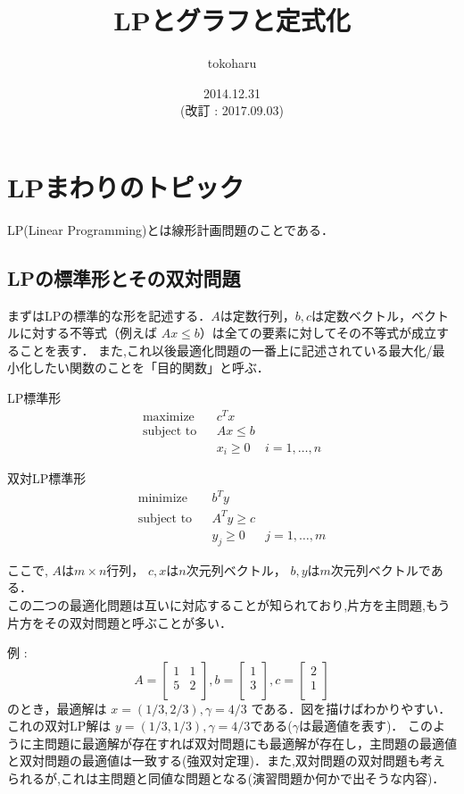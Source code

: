 \documentclass[13pt]{jarticle}
\title{LPとグラフと定式化}
\author{tokoharu}
\date {2014.12.31 \\ (改訂 : 2017.09.03)}
\theoremstyle{nonitalic} %
\begin{document}
\maketitle

\section{LPまわりのトピック}
LP(Linear Programming)とは線形計画問題のことである．
\subsection {LPの標準形とその双対問題}
まずはLPの標準的な形を記述する．$A$は定数行列，$b, c$は定数ベクトル，ベクトルに対する不等式（例えば $Ax \leq b$）は全ての要素に対してその不等式が成立することを表す． また,これ以後最適化問題の一番上に記述されている最大化/最小化したい関数のことを「目的関数」と呼ぶ．

LP標準形
\begin{align}
 &&&&&\textrm{maximize}   && c^Tx \\
 &&&&&\textrm{subject to} && Ax \leq b  &&&&&\\
 &&&&&                    && x_i \geq 0 & i = 1,\dots,n &&&&&
\end{align}

双対LP標準形
\begin{align}
 &&&&&\textrm{minimize}   && b^Ty \\
 &&&&&\textrm{subject to} && A^T y \geq c  &&&&&\\
 &&&&&                    && y_j \geq 0 & j = 1,\dots,m &&&&&
\end{align}

 
ここで, $A$は$m\times n$行列， 
$c,x$は$n$次元列ベクトル， 
$b,y$は$m$次元列ベクトルである． \\

この二つの最適化問題は互いに対応することが知られており,片方を主問題,もう片方をその双対問題と呼ぶことが多い．

例 : 
\begin{equation*}
 A = 
 \left[\begin{array}{cc}
  1 & 1 \\
  5 & 2 \\
 \end{array}\right],
 b = 
 \left[\begin{array}{c}
     1 \\
     3 \\
   \end{array}\right],
 c = 
 \left[\begin{array}{c}
     2 \\
     1 \\
 \end{array}\right]
\end{equation*}
のとき，最適解は $x = (1/3, 2/3) , \gamma = 4/3  $ である．図を描けばわかりやすい．これの双対LP解は
$y = (1/3, 1/3), \gamma = 4/3$である($\gamma$は最適値を表す)．
このように主問題に最適解が存在すれば双対問題にも最適解が存在し，主問題の最適値と双対問題の最適値は一致する(強双対定理)．また,双対問題の双対問題も考えられるが,これは主問題と同値な問題となる(演習問題か何かで出そうな内容)．
\end{document}
